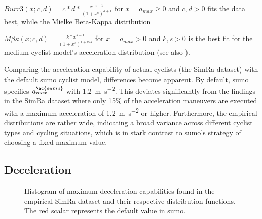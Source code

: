 $Burr3(x; c,d) = c*d*\frac{x^{-c-1}}{(1+x^c)^{d+1}}$ for $x = a_{max} \geq 0$ and $c,d > 0$ fits the data best, while the Mielke Beta-Kappa distribution~\cite{mielke1973distribution}

$M\beta\kappa(x; c,d) = \frac{k*x^{k-1}}{(1+x^s)^{1+k/s}}$ for $x = a_{max} > 0$ and $k,s > 0$ is the best fit for the medium cyclist model's acceleration distribution (see also ).

Comparing the acceleration capability of actual cyclists (the SimRa dataset) with the default \ac{sumo} cyclist model, differences become apparent.
By default, \ac{sumo} specifies $a_{max}^{\ac{sumo}}$ with \SI{1.2}{\metre\per\square\second}.
This deviates significantly from the findings in the SimRa dataset where only \num{15}\% of the acceleration maneuvers are executed with a maximum acceleration of \SI{1.2}{\metre\per\square\second} or higher.
Furthermore, the empirical distributions are rather wide, indicating a broad variance across different cyclist types and cycling situations, which is in stark contrast to \ac{sumo}'s strategy of choosing a fixed maximum value.

\subsection{Deceleration}
\label{subsec:deceleration_preprocessing}

\begin{figure}
    \centering
    \hfill
    \caption{%
        Histogram of maximum deceleration capabilities found in the empirical SimRa dataset and their respective distribution functions.
        The red scalar represents the default value in \ac{sumo}.
    }%
    \label{fig:analysis_max_deceleration_dist_fit}
\end{figure}

